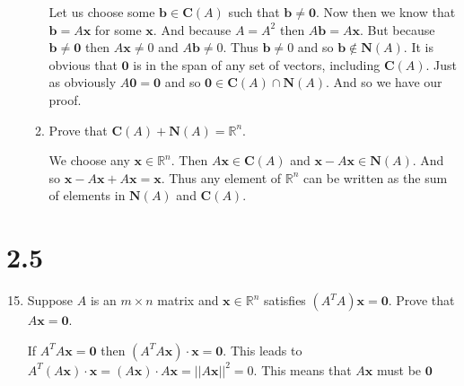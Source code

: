 \documentclass[letterpaper]{article}
\begin{document}
\begin{enumerate}
\begin{enumerate}
  Let us choose some $\mathbf{b}\in \mathbf{C}(A)$ such that $\mathbf{b}\ne \mathbf{0}$. Now then we know that $\mathbf{b}=A\mathbf{x}$ for some $\mathbf{x}$. And because $A=A^2$ then $A\mathbf{b}=A\mathbf{x}$. But because $\mathbf{b}\ne \mathbf{0}$ then $A\mathbf{x}\ne0$ and $A\mathbf{b}\ne 0$. Thus $\mathbf{b}\ne 0$ and so $\mathbf{b}\not\in \mathbf{N}(A)$. It is obvious that $\mathbf{0}$ is in the span of any set of vectors, including $\mathbf{C}(A)$. Just as obviously $A\mathbf{0}=\mathbf{0}$ and so $\mathbf{0}\in \mathbf{C}(A)\cap \mathbf{N}(A)$. And so we have our proof.
  \item
  Prove that $\mathbf{C}(A)+\mathbf{N}(A)=\mathbb{R}^n$.

  We choose any $\mathbf{x}\in \mathbb{R}^n$. Then $A\mathbf{x}\in \mathbf{C}(A)$ and $\mathbf{x}-A\mathbf{x}\in \mathbf{N}(A)$. And so $\mathbf{x}-A\mathbf{x}+A\mathbf{x}=\mathbf{x}$. Thus any element of $\mathbb{R}^n$ can be written as the sum of elements in $\mathbf{N}(A)$ and $\mathbf{C}(A)$.
  \end{enumerate}
\end{enumerate}
\section*{2.5}
\begin{enumerate}
\setcounter{enumi}{14}
\item
Suppose $A$ is an $m\times n$ matrix and $\mathbf{x}\in \mathbb{R}^n$ satisfies $(A^{T}A)\mathbf{x}=\mathbf{0}$. Prove that $A\mathbf{x}=\mathbf{0}$.

If $A^TA\mathbf{x}=\mathbf{0}$ then $(A^TA\mathbf{x})\cdot\mathbf{x}=\mathbf{0}$. This leads to $A^T(A\mathbf{x})\cdot\mathbf{x}=(A\mathbf{x})\cdot A\mathbf{x}=||A\mathbf{x}||^2=0$. This means that $A\mathbf{x}$ must be $\mathbf{0}$
\end{enumerate}
\end{document}
